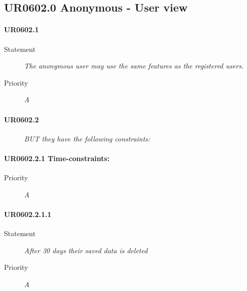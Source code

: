 \subsection{UR0602.0 Anonymous - User view}


\paragraph{UR0602.1}
\begin{description}
\item [Statement] \textit{
The \gls{anonymous user} may use the same features as the registered users.
}
\item [Priority] \textit{A}
\end{description}

\paragraph{UR0602.2}
\begin{description}
\item [] \textit{
BUT they have the following constraints:
}
\end{description}

\paragraph{UR0602.2.1 Time-constraints:}
\begin{description}
\item [Priority] \textit{A}
\end{description}

\paragraph{UR0602.2.1.1}
\begin{description}
\item [Statement] \textit{
After 30 days their saved data is deleted
}
\item [Priority] \textit{A}
\end{description}

